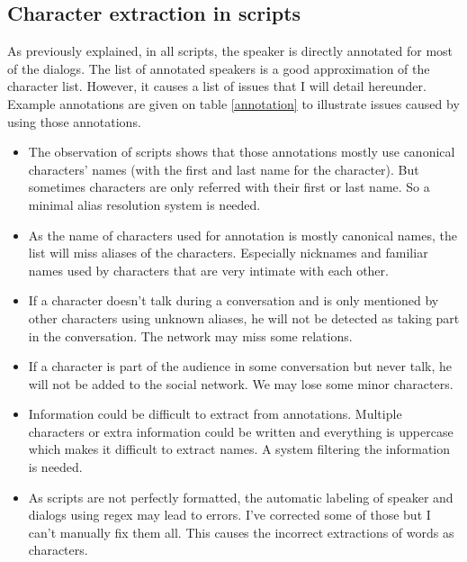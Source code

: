 \documentclass[a4paper, 12pt]{report}
\begin{document}
\subsection{Character extraction in scripts}
As previously explained, in all scripts, the speaker is directly annotated for most of the dialogs.
The list of annotated speakers is a good approximation of the character list. However, it causes a list of issues that I will detail hereunder.
Example annotations are given on table \ref{annotation} to illustrate issues caused by using those annotations.\\

\begin{itemize}
\item
The observation of scripts shows that those annotations mostly use canonical characters' names (with the first and last name for the character).
But sometimes characters are only referred with their first or last name. So a minimal alias resolution system is needed.
\item
As the name of characters used for annotation is mostly canonical names, the list will miss aliases of the characters.
Especially nicknames and familiar names used by characters that are very intimate with each other.
\item If a character doesn't talk during a conversation and is only mentioned by other characters using unknown aliases,
he will not be detected as taking part in the conversation. The network may miss some relations.
\item
If a character is part of the audience in some conversation but never talk, he will not be added to the social network. We may lose some minor characters.
\item Information could be difficult to extract from annotations.
Multiple characters or extra information could be written and everything is uppercase which makes it difficult to extract names. A system filtering the information is needed.
\item As scripts are not perfectly formatted, the automatic labeling of speaker and dialogs using regex may lead to errors.
I've corrected some of those but I can't manually fix them all. This causes the incorrect extractions of words as characters.
\end{itemize}
\end{document}
